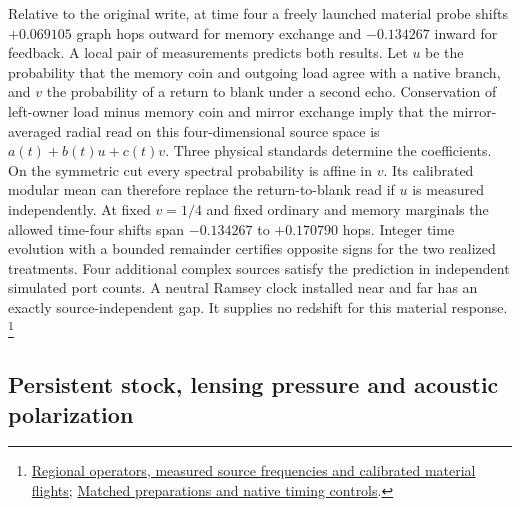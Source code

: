 \documentclass[11pt]{article}
\begin{document}
Relative to the original write, at time four a freely launched material
probe shifts $+0.069105$ graph hops outward for memory exchange and
$-0.134267$ inward for feedback. A local pair of measurements predicts
both results. Let $u$ be the probability that the memory coin and outgoing
load agree with a native branch, and $v$ the probability of a return to
blank under a second echo. Conservation of left-owner load minus memory
coin and mirror exchange imply that the mirror-averaged radial read on
this four-dimensional source space is $a(t)+b(t)u+c(t)v$. Three physical
standards determine the coefficients. On the symmetric cut every spectral
probability is affine in $v$. Its calibrated modular mean can therefore
replace the return-to-blank read if $u$ is measured independently.
At fixed $v=1/4$ and fixed ordinary and memory marginals the allowed
time-four shifts span $-0.134267$ to $+0.170790$ hops. Integer time
evolution with a bounded remainder certifies opposite signs for the two
realized treatments. Four additional complex sources
satisfy the prediction in independent simulated port counts. A neutral
Ramsey clock installed near and far has an exactly source-independent gap.
It supplies no redshift for this material response.%
\footnote{\href{https://github.com/FloatingPragma/observer-patch-holography/tree/main/model/experiments/interval_echo_shell_flux/product_address/green_response/material_recoil/overlap_source/native_boundary/regional_reference}{Regional operators, measured source frequencies and calibrated material flights};
\href{https://github.com/FloatingPragma/observer-patch-holography/tree/main/model/experiments/interval_echo_shell_flux/product_address/green_response/material_recoil/overlap_source/native_boundary/matched_probe}{Matched preparations and native timing controls}.}

\subsection{Persistent stock, lensing pressure and acoustic polarization}
\end{document}

